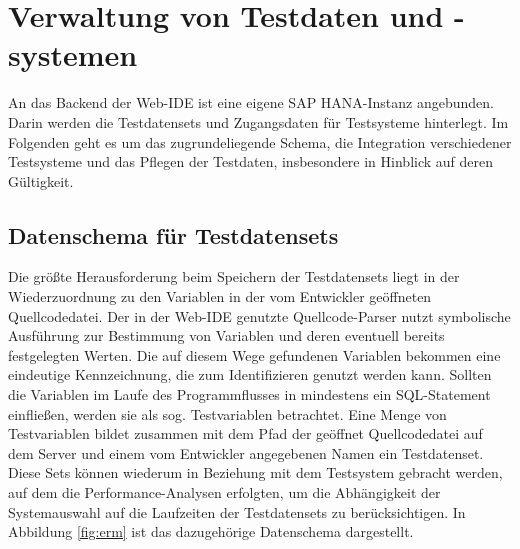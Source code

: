 \section{Verwaltung von Testdaten und -systemen}\label{chap:testdataadministration}

%
%

An das Backend der Web-IDE ist eine eigene SAP HANA-Instanz angebunden.
Darin werden die Testdatensets und Zugangsdaten für Testsysteme hinterlegt.
Im Folgenden geht es um das zugrundeliegende Schema, die Integration verschiedener Testsysteme und das Pflegen der Testdaten, insbesondere in Hinblick auf deren Gültigkeit.

\subsection{Datenschema für Testdatensets}
Die größte Herausforderung beim Speichern der Testdatensets liegt in der Wiederzuordnung zu den Variablen in der vom Entwickler geöffneten Quellcodedatei.
Der in der Web-IDE genutzte Quellcode-Parser \cite{Horschig2014} nutzt symbolische Ausführung \cite{DBLP:journals/cacm/King76} zur Bestimmung von Variablen und deren eventuell bereits festgelegten Werten.
Die auf diesem Wege gefundenen Variablen bekommen eine eindeutige Kennzeichnung, die zum Identifizieren genutzt werden kann.
Sollten die Variablen im Laufe des Programmflusses in mindestens ein SQL-Statement einfließen, werden sie als sog. Testvariablen betrachtet.
Eine Menge von Testvariablen bildet zusammen mit dem Pfad der geöffnet Quellcodedatei auf dem Server und einem vom Entwickler angegebenen Namen ein Testdatenset.
Diese Sets können wiederum in Beziehung mit dem Testsystem gebracht werden, auf dem die Performance-Analysen erfolgten, um die Abhängigkeit der Systemauswahl auf die Laufzeiten der Testdatensets zu berücksichtigen.
In Abbildung \ref{fig:erm} ist das dazugehörige Datenschema dargestellt.

\newcommand {\key}[1]{\underline{#1}}

